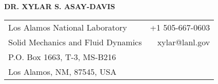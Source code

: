 \documentclass[12pt,letterpaper]{article}
\begin{document}
\setlength{\parindent}{0in}

\pagestyle{fancy}
\renewcommand{\headrulewidth}{0.0pt}


\begin{center}
{\bf \color{titleBlue} DR. XYLAR S. ASAY-DAVIS}\\
\end{center}

\begin{tabularx}{\textwidth}{@{}  X r @{} }
  Los Alamos National Laboratory &  +1 505-667-0603 \\
  Solid Mechanics and Fluid Dynamics &  xylar@lanl.gov\\
  P.O. Box 1663, T-3, MS-B216\\
  Los Alamos, NM, 87545, USA \\
\end{tabularx}
\end{document}
